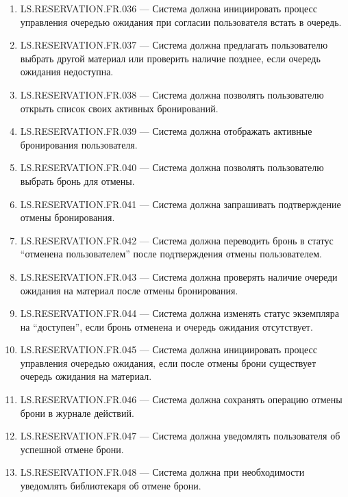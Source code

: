 \documentclass[12pt,a4paper]{article}
\begin{document}
\begin{enumerate}
		\item LS.RESERVATION.FR.036 --- Система должна инициировать процесс управления
		очередью ожидания при согласии пользователя встать в очередь.
		
		\item LS.RESERVATION.FR.037 --- Система должна предлагать пользователю выбрать
		другой материал или проверить наличие позднее, если очередь ожидания
		недоступна.
		
		\item LS.RESERVATION.FR.038 --- Система должна позволять пользователю открыть
		список своих активных бронирований.
		
		\item LS.RESERVATION.FR.039 --- Система должна отображать активные
		бронирования пользователя.
		
		\item LS.RESERVATION.FR.040 --- Система должна позволять пользователю выбрать
		бронь для отмены.
		
		\item LS.RESERVATION.FR.041 --- Система должна запрашивать подтверждение отмены
		бронирования.
		
		\item LS.RESERVATION.FR.042 --- Система должна переводить бронь в статус
		``отменена пользователем'' после подтверждения отмены пользователем.
		
		\item LS.RESERVATION.FR.043 --- Система должна проверять наличие очереди
		ожидания на материал после отмены бронирования.
		
		\item LS.RESERVATION.FR.044 --- Система должна изменять статус экземпляра на
		``доступен'', если бронь отменена и очередь ожидания отсутствует.
		
		\item LS.RESERVATION.FR.045 --- Система должна инициировать процесс управления
		очередью ожидания, если после отмены брони существует очередь ожидания на
		материал.
		
		\item LS.RESERVATION.FR.046 --- Система должна сохранять операцию отмены брони
		в журнале действий.
		
		\item LS.RESERVATION.FR.047 --- Система должна уведомлять пользователя об
		успешной отмене брони.
		
		\item LS.RESERVATION.FR.048 --- Система должна при необходимости уведомлять
		библиотекаря об отмене брони.
		

\end{enumerate}
\end{document}
